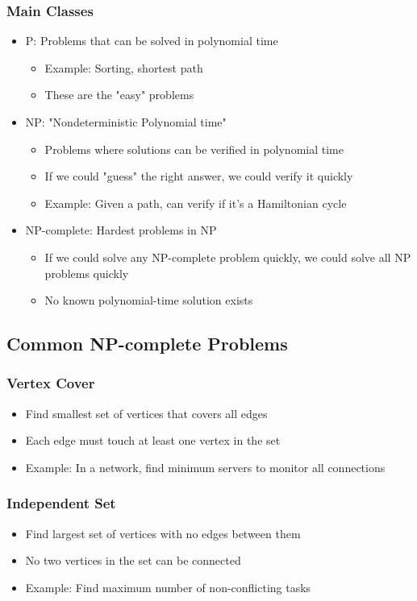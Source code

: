 \documentclass[11pt,a4paper]{article}
\begin{document}
\begin{multicols}{2}
\subsubsection{Main Classes}
\begin{itemize}
    \item P: Problems that can be solved in polynomial time
    \begin{itemize}
        \item Example: Sorting, shortest path
        \item These are the "easy" problems
    \end{itemize}
    \item NP: "Nondeterministic Polynomial time"
    \begin{itemize}
        \item Problems where solutions can be verified in polynomial time
        \item If we could "guess" the right answer, we could verify it quickly
        \item Example: Given a path, can verify if it's a Hamiltonian cycle
    \end{itemize}
    \item NP-complete: Hardest problems in NP
    \begin{itemize}
        \item If we could solve any NP-complete problem quickly, we could solve all NP problems quickly
        \item No known polynomial-time solution exists
    \end{itemize}
\end{itemize}

\subsection{Common NP-complete Problems}
\subsubsection{Vertex Cover}
\begin{itemize}
    \item Find smallest set of vertices that covers all edges
    \item Each edge must touch at least one vertex in the set
    \item Example: In a network, find minimum servers to monitor all connections
\end{itemize}

\subsubsection{Independent Set}
\begin{itemize}
    \item Find largest set of vertices with no edges between them
    \item No two vertices in the set can be connected
    \item Example: Find maximum number of non-conflicting tasks
\end{itemize}


\end{multicols}
\end{document}

